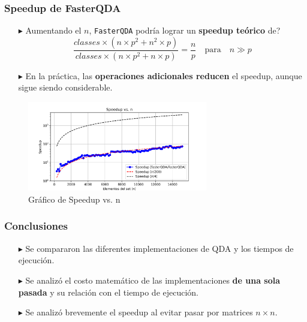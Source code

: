 \begin{frame}[fragile]
    \frametitle{Speedup de FasterQDA}

    \begin{itemize}
        \item[$\blacktriangleright$]  Aumentando el \(n\), \texttt{FasterQDA} podría lograr un \textbf{speedup teórico} de?
        \[
            \frac{classes \times (n \times p^2 + n^2 \times p)}{classes \times (n \times p^2 + n \times p)} = \frac{n}{p} \quad \text{para} \quad n \gg p
        \]
        \item[$\blacktriangleright$]  En la práctica, las \textbf{operaciones adicionales reducen} el speedup, aunque sigue siendo considerable.
    \end{itemize}
    \begin{figure}
        \centering
        \includegraphics[width=0.7\textwidth]{../speedup_vs_n.png} %
        \caption{Gráfico de Speedup vs. n}
    \end{figure}
\end{frame}

\begin{frame}[fragile]
    \frametitle{Conclusiones}

    \begin{itemize}
        \item[$\blacktriangleright$] Se compararon las diferentes implementaciones de QDA y los tiempos de ejecución.
        \item[$\blacktriangleright$] Se analizó el costo matemático de las implementaciones \textbf{de una sola pasada} y su relación con el tiempo de ejecución.
        \item[$\blacktriangleright$] Se analizó brevemente el speedup al evitar pasar por matrices \(n \times n\).

    \end{itemize}

\end{frame}
